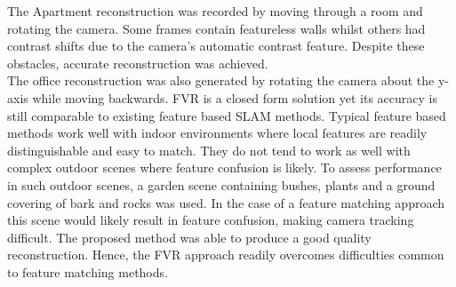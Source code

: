 The Apartment reconstruction was recorded by moving through a room and rotating the camera. Some frames contain featureless walls whilst others had contrast shifts due to the camera's automatic contrast feature. Despite these obstacles, accurate reconstruction was achieved. \\

The office reconstruction was also generated by rotating the camera about the y-axis while moving backwards. FVR is a closed form solution yet its accuracy is still comparable to existing feature based SLAM methods. Typical feature based methods work well with indoor environments where local features are readily distinguishable and easy to match. They do not tend to work as well with complex outdoor scenes where feature confusion is likely. To assess performance in such outdoor scenes, a garden scene containing bushes, plants and a ground covering of bark and rocks was used. In the case of a feature matching approach this scene would likely result in feature confusion, making camera tracking difficult. The proposed method was able to produce a good quality reconstruction. Hence, the FVR approach readily overcomes difficulties common to feature matching methods.             
